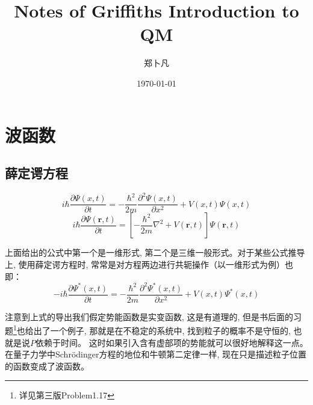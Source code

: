 \documentclass[a4paper,zihao=-4,linespread=1]{ctexrep}
\title{Notes of Griffiths Introduction to QM}   %
\author{郑卜凡}                     %
\date{\today}                             %
\newenvironment{lequation}{\large\begin{equation}}{\end{equation}}
\begin{document}
    \maketitle              %
    \tableofcontents        %
    \chapter{波函数}
    \section{薛定谔方程}
    \begin{lequation}\label{S-1-D}
        \boxed{
            i\hbar\frac{\partial \Psi\left(x,t\right)}{\partial t}=-\frac{\hbar^{2}}{2m}\frac{\partial^{2}\Psi\left(x,t\right)}{\partial x^{2}}+
            V\left(x,t\right)\Psi\left(x,t\right)
        }
    \end{lequation}
    \begin{lequation}\label{S-3-D}
        \boxed{
            i\hbar\frac{\partial \Psi\left(\bm{r},t\right)}{\partial t}=\left[-\frac{\hbar^{2}}{2m}\nabla^{2}+
            V\left(\bm{r},t\right)\right]\Psi\left(\bm{r},t\right) 
        }
    \end{lequation}


    上面给出的公式中第一个是一维形式, 第二个是三维一般形式。对于某些公式推导上, 使用薛定谔方程时, 常常是对方程两边进行共轭操作（以一维形式为例）也即：
    \begin{lequation}
        -i\hbar\frac{\partial \Psi^{*}\left(x,t\right)}{\partial t}=-\frac{\hbar^{2}}{2m}\frac{\partial^{2}\Psi^{*}\left(x,t\right)}{\partial x^{2}}+
        V\left(x,t\right)\Psi^{*}\left(x,t\right)
    \end{lequation}


    注意到上式的导出我们假定势能函数是实变函数, 这是有道理的, 但是书后面的习题\footnote[1]{详见第三版Problem1.17}也给出了一个例子, 那就是在不稳定的系统中, 找到粒子的概率不是守恒的, 也就是说$P$依赖于时间。
    这时如果引入含有虚部项的势能就可以很好地解释这一点。在量子力学中Schr{\"o}dinger方程的地位和牛顿第二定律一样, 现在只是描述粒子位置的函数变成了波函数。
\end{document}
